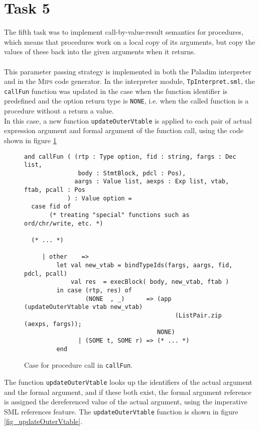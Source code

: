 \section{Task 5}
The fifth task was to implement call-by-value-result semantics for procedures,
which means that procedures work on a local copy of its arguments, but copy the
values of these back into the given arguments when it returns.\\
\\
This parameter passing strategy is implemented in both the \textsf{Paladim}
interpreter and in the \textsc{Mips} code generator. In the interpreter module,
\verb|TpInterpret.sml|, the \verb|callFun| function was updated in the case when
the function identifier is predefined and the  option return type is
\verb|NONE|, i.e. when the called function is a procedure without a return a
value.\\
In this case, a new function \verb|updateOuterVtable| is applied to each pair of
actual expression argument and formal argument of the function call, using the
code shown in figure \ref{fig_callFun}
 
\begin{figure}[H]
  \begin{lstlisting}[style=MLStyle]
and callFun ( (rtp : Type option, fid : string, fargs : Dec list,
               body : StmtBlock, pdcl : Pos),
              aargs : Value list, aexps : Exp list, vtab, ftab, pcall : Pos
            ) : Value option =
  case fid of
       (* treating "special" functions such as ord/chr/write, etc. *)

  (* ... *)

     | other    =>
         let val new_vtab = bindTypeIds(fargs, aargs, fid, pdcl, pcall)
             val res  = execBlock( body, new_vtab, ftab )
         in case (rtp, res) of
                 (NONE  , _)      => (app (updateOuterVtable vtab new_vtab)
                                          (ListPair.zip (aexps, fargs));
                                     NONE)
               | (SOME t, SOME r) => (* ... *)
         end
  \end{lstlisting}
  \caption{Case for procedure call in \texttt{callFun}.}
  \label{fig_callFun}
\end{figure}

\noindent
The function \verb|updateOuterVtable| looks up the identifiers of the actual
argument and the formal argument, and if these both exist, the formal argument
reference is assigned the dereferenced value of the actual argument, using the
imperative SML references feature. The \verb|updateOuterVtable| function is
shown in figure \ref{fig_updateOuterVtable}.
 
